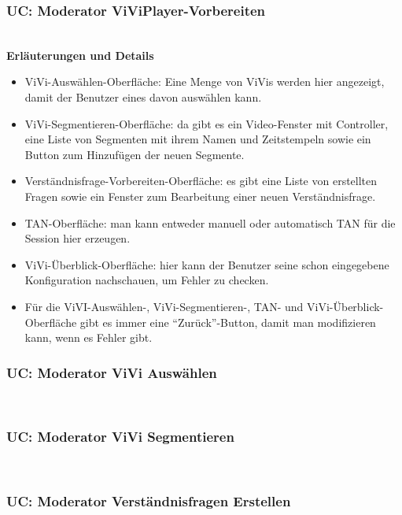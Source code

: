 \subsubsection{UC: Moderator ViViPlayer-Vorbereiten}

\\[0.5cm]
\textbf{Erläuterungen und Details}
\begin{itemize}
	\item ViVi-Auswählen-Oberfläche: Eine Menge von ViVis werden hier angezeigt, damit der Benutzer eines davon auswählen kann.
	\item ViVi-Segmentieren-Oberfläche: da gibt es ein Video-Fenster mit Controller, eine Liste von Segmenten mit ihrem Namen und Zeitstempeln sowie ein Button zum Hinzufügen der neuen Segmente. 
	\item Verständnisfrage-Vorbereiten-Oberfläche: es gibt eine Liste von erstellten Fragen
	sowie ein Fenster zum Bearbeitung einer neuen Verständnisfrage.
	\item TAN-Oberfläche: man kann entweder manuell oder automatisch TAN für die Session hier erzeugen.
	\item ViVi-Überblick-Oberfläche: hier kann der Benutzer seine schon eingegebene Konfiguration nachschauen, um Fehler zu checken.
	\item Für die ViVI-Auswählen-, ViVi-Segmentieren-, TAN- und ViVi-Überblick-Oberfläche gibt es immer eine 
	``Zurück''-Button, damit man modifizieren kann, wenn es Fehler gibt.
\end{itemize}
\pagebreak

\subsubsection{UC: Moderator ViVi Auswählen}

\\[0.5cm]
\pagebreak

\subsubsection{UC: Moderator ViVi Segmentieren}

\\[0.5cm]
\pagebreak

\subsubsection{UC: Moderator Verständnisfragen Erstellen}

\\[0.5cm]
\pagebreak

